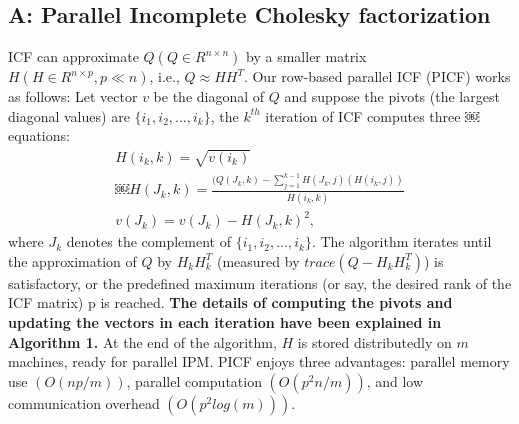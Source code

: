 \documentclass[12pt]{article}
\begin{document}
\subsection{A: Parallel Incomplete Cholesky factorization }
ICF can approximate $Q (Q \in R^{n\times n})$ by a smaller matrix $H (H \in R^{n\times p},p \ll n)$, i.e., $Q \approx HH^T$.
Our row-based parallel ICF (PICF) works as follows: Let vector $v$ be the diagonal of $Q$ and suppose the pivots (the largest diagonal values) are $\{i_1, i_2, . . . , i_k\}$, the $k^{th}$ iteration of ICF computes three
￼equations:
\begin{gather}
H(i_k, k) = \sqrt{v(i_k)}\\
￼H(J_k, k) = \frac{(Q(J_k, k) - \sum_{j=1}^{k-1}{H(J_k, j)(H(i_k, j))}}{H(i_k, k)}\\
v(J_k) = v(J_k) - H(J_k, k)^2, 
\end{gather}
where $J_k$ denotes the complement of $\{i_1 , i_2 , . . . , i_k \}$. The algorithm iterates until the approximation of $Q$ by $H_k H_ k^T$ (measured by $trace(Q − H_k H_k^T )$) is satisfactory, or the predefined maximum iterations (or say, the desired rank of the ICF matrix) p is reached.\newline
\newline
{\bf The details of computing the pivots and updating the vectors in each iteration have been explained in Algorithm 1.}
\newline
At the end of the algorithm, $H$ is stored distributedly on $m$ machines, ready for parallel IPM. PICF enjoys three advantages: parallel memory use $(O(np/m))$, parallel computation $(O(p^2n/m))$, and low communication overhead $(O(p^2 log(m)))$. 
\end{document}
